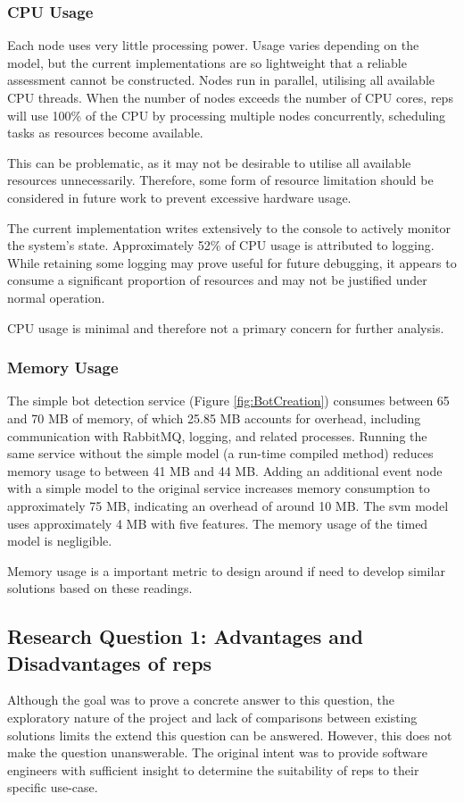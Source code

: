 \documentclass[a4paper,8pt]{article}
\begin{document}
				\subsubsection{CPU Usage}
					Each node uses very little processing power. Usage varies depending on the model, but the current implementations are so lightweight that a reliable assessment cannot be constructed. Nodes run in parallel, utilising all available CPU threads. When the number of nodes exceeds the number of CPU cores, \gls{reps} will use 100\% of the CPU by processing multiple nodes concurrently, scheduling tasks as resources become available.
					
					This can be problematic, as it may not be desirable to utilise all available resources unnecessarily. Therefore, some form of resource limitation should be considered in future work to prevent excessive hardware usage.
					
					The current implementation writes extensively to the console to actively monitor the system’s state. Approximately 52\% of CPU usage is attributed to logging. While retaining some logging may prove useful for future debugging, it appears to consume a significant proportion of resources and may not be justified under normal operation.
					
					CPU usage is minimal and therefore not a primary concern for further analysis.
					
				\subsubsection{Memory Usage}
					The simple bot detection service (Figure \ref{fig:BotCreation}) consumes between 65 and 70 MB of memory, of which 25.85 MB accounts for overhead, including communication with RabbitMQ, logging, and related processes. Running the same service without the simple model (a run-time compiled method) reduces memory usage to between 41 MB and 44 MB. Adding an additional event node with a simple model to the original service increases memory consumption to approximately 75 MB, indicating an overhead of around 10 MB.  The \gls{svm} model uses approximately 4 MB with five features. The memory usage of the timed model is negligible.
					
					Memory usage is a important metric to design around if need to develop similar solutions based on these readings.
		\newpage	
		\subsection{Research Question 1: Advantages and Disadvantages of \gls{reps}}
			Although the goal was to prove a concrete answer to this question, the exploratory nature of the project and lack of comparisons between existing solutions limits the extend this question can be answered. However, this does not make the question unanswerable. The original intent was to provide software engineers with sufficient insight to determine the suitability of \gls{reps} to their specific use-case.
			
\end{document}
